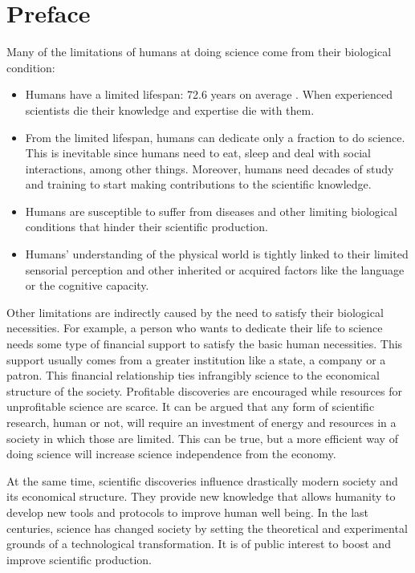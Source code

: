 \documentclass[11pt,a4paper,twoside]{report}
\newcommand{\+}{\textnormal{+} }
\theoremstyle{definition}
\numberwithin{equation}{chapter}
\begin{document}
\chapter{Preface} 

Many of the limitations of humans at doing science come from their biological 
condition:
    \begin{itemize}
        \item  Humans have a limited lifespan: 72.6 years on average 
        \cite{owidlifeexpectancy}. When experienced scientists die their
        knowledge and expertise die with them.
        \item From the limited lifespan, humans can dedicate only a fraction to
        do science. This is inevitable since humans need to eat, sleep and deal
        with social interactions, among other things. Moreover, humans need
        decades of study and training to start making contributions to the 
        scientific knowledge.
        \item Humans are susceptible to suffer from diseases and other limiting
        biological conditions that hinder their scientific production.
        \item Humans' understanding of the physical world is tightly linked to 
        their limited sensorial perception and other inherited or acquired 
        factors like the language or the cognitive capacity.
    \end{itemize}
    
Other limitations are indirectly caused by the need to satisfy their biological
necessities. For example, a person who wants to dedicate their life to science
needs some type of financial support to satisfy the basic human necessities. 
This support usually comes from a greater institution like a state, a company or
a patron. This financial relationship ties infrangibly science to the economical
structure of the society. Profitable discoveries are encouraged while resources
for unprofitable science are scarce. It can be argued that any form of
scientific research, human or not, will require an investment of energy and
resources in a society in which those are limited. This can be true, but a more
efficient way of doing science will increase science independence from the
economy. 

At the same time, scientific discoveries influence drastically modern society
and its economical structure. They provide new knowledge that allows humanity to
develop new tools and protocols to improve human well being. In the last
centuries, science has changed society by setting the theoretical and
experimental grounds of a technological transformation. It is of public
interest to boost and improve scientific production.
\end{document}
